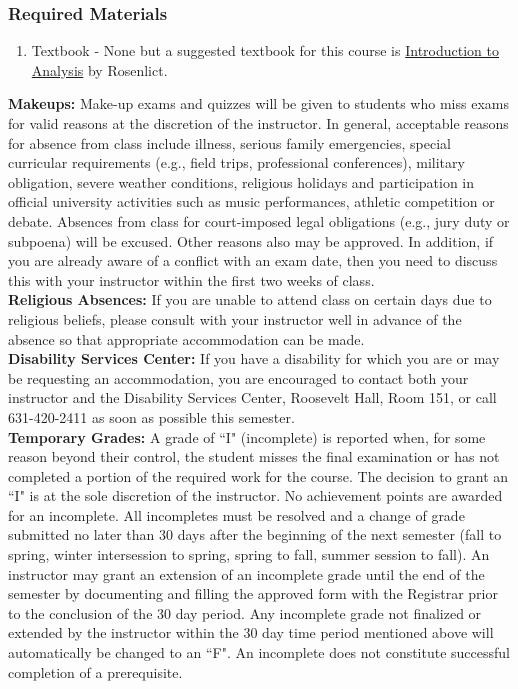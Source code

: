 \documentclass[11pt]{article}
\begin{document}
\subsubsection*{Required Materials}
\begin{enumerate}[--]
 \item Textbook - None but a suggested textbook for this course is \href{https://www.amazon.com/Introduction-Analysis-Dover-Books-Mathematics/dp/0486650383/}{Introduction to Analysis} by Rosenlict.\\
\end{enumerate}


{\bf Makeups:} Make-up exams and quizzes will be given to students who miss exams for valid reasons at the discretion of the instructor. In general, acceptable reasons for absence from class include illness, serious family emergencies, special curricular requirements (e.g., field trips, professional conferences), military obligation, severe weather conditions, religious holidays and participation in official university activities such as music performances, athletic competition or debate. Absences from class for court-imposed legal obligations (e.g., jury duty or subpoena) will be excused. Other reasons also may be approved. In addition, if you are already aware of a conflict with an exam date, then you need to discuss this with your instructor within the first two weeks of class. \\

{\bf Religious Absences:} If you are unable to attend class on certain days due to religious beliefs, please consult with your instructor well in advance of the absence so that appropriate accommodation can be made.\\

{\bf Disability Services Center:} If you have a disability for which you are or may be requesting an accommodation, you are encouraged to contact both your instructor and the Disability Services Center, Roosevelt Hall, Room 151, or call 631-420-2411 as soon as possible this semester.\\

{\bf Temporary Grades:} A grade of ``I" (incomplete) is reported when, for some reason beyond their control, the student misses the final examination or has not completed a portion of the required work for the course. The decision to grant an ``I" is at the sole discretion of the instructor. No achievement points are awarded for an incomplete. All incompletes must be resolved and a change of grade submitted no later than 30 days after the beginning of the next semester (fall to spring, winter intersession to spring, spring to fall, summer session to fall). An instructor may grant an extension of an incomplete grade until the end of the semester by documenting and filling the approved form with the Registrar prior to the conclusion of the 30 day period. Any incomplete grade not finalized or extended by the instructor within the 30 day time period mentioned above will automatically be changed to an ``F". An incomplete does not constitute successful completion of a prerequisite.  \\
\end{document}
